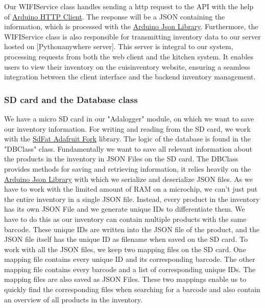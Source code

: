 \documentclass{article}
\begin{document}
Our WIFIService class handles sending a http request to the API with the help of \href{https://github.com/arduino-libraries/ArduinoHttpClient}{Arduino HTTP Client}.
The response will be a JSON containing the information, which is processed with the \href{https://github.com/bblanchon/ArduinoJson}{Arduino Json Library}. Furthermore, the WIFIService class is also responsible for transmitting inventory data to our server hosted on \href{https://www.pythonanywhere.com/}[Pythonanywhere server]. This server is integral to our system, processing requests from both the web client and the kitchen system. It enables users to view their inventory on the cuisinventory website, ensuring a seamless integration between the client interface and the backend inventory management.

\subsubsection{SD card and the Database class}
We have a micro SD card in our "Adalogger" module, on which we want to save our inventory information.
For writing and reading from the SD card, we work with the \href{https://github.com/adafruit/SdFat}{SdFat Adafruit Fork} library.
The logic of the database is found in the "DBClass" class. Fundamentally we want to save all relevant information about the products in the inventory in JSON Files on the SD card.
The DBClass provides methods for saving and retrieving information, it relies heavily on the \href{https://github.com/bblanchon/ArduinoJson}{Arduino Json Library} with which we serialize and deserialize JSON files.
As we have to work with the limited amount of RAM on a microchip, we can't just put the entire inventory in a single JSON file.
Instead, every product in the inventory has its own JSON File and we generate unique IDs to differentiate them. We have to do this as our inventory can contain multiple products with the same barcode.
These unique IDs are written into the JSON file of the product, and the JSON file itself has the unique ID as filename when saved on the SD card.
To work with all the JSON files, we keep two mapping files on the SD card. One mapping file contains every unique ID and its corresponding barcode.
The other mapping file contains every barcode and a list of corresponding unique IDs. The mapping files are also saved as JSON Files.
These two mappings enable us to quickly find the corresponding files when searching for a barcode and also contain an overview of all products in the inventory.
\end{document}
